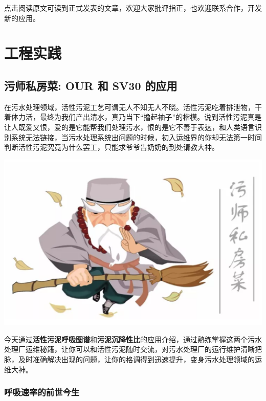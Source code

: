 \documentclass[
]{book}
\begin{document}
点击阅读原文可读到正式发表的文章，欢迎大家批评指正，也欢迎联系合作，开发新的应用。

\hypertarget{eng}{%
\chapter{工程实践}\label{eng}}

\hypertarget{ux6c61ux5e08ux79c1ux623fux83dc-our-ux548c-sv30-ux7684ux5e94ux7528}{%
\section{污师私房菜: OUR 和 SV30 的应用}\label{ux6c61ux5e08ux79c1ux623fux83dc-our-ux548c-sv30-ux7684ux5e94ux7528}}

在污水处理领域，活性污泥工艺可谓无人不知无人不晓。活性污泥吃着排泄物，干着体力活，最终为我们产出清水，真乃当下``撸起袖子''的楷模。说到活性污泥真是让人既爱又恨，爱的是它能帮我们处理污水，恨的是它不善于表达，和人类语言识别系统无法链接，当污水处理系统出问题的时候，初入运维界的你却无法第一时间判断活性污泥究竟为什么罢工，只能求爷爷告奶奶的到处请教大神。

\includegraphics[width=6.67in]{images/os1}

今天通过\textbf{活性污泥呼吸图谱}和\textbf{污泥沉降性比}的应用介绍，通过熟练掌握这两个污水处理厂运维秘籍，让你可以和活性污泥随时交流，对污水处理厂的运行维护清晰把脉，及时准确解决出现的问题，让你的格调得到迅速提升，变身污水处理领域的运维大神。

\hypertarget{ux547cux5438ux901fux7387ux7684ux524dux4e16ux4ecaux751f}{%
\subsection{呼吸速率的前世今生}\label{ux547cux5438ux901fux7387ux7684ux524dux4e16ux4ecaux751f}}
\end{document}
